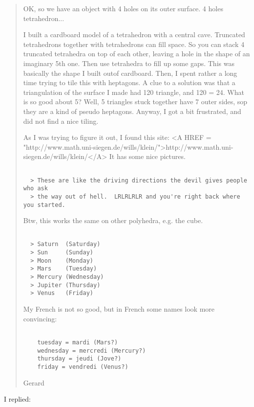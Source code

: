 \begin{quote}
OK, so we have an object with 4 holes on its outer surface.
4 holes \to  tetrahedron...

I built a cardboard model of a tetrahedron with a central
cave.  Truncated tetrahedrons together with tetrahedrons
can fill space.  So you can stack 4 truncated tetrahedra
on top of each other, leaving a hole in the shape of
an imaginary 5th one. Then use tetrahedra to fill up
some gaps. This was basically the shape I built outof
cardboard. Then, I spent rather a long time trying to
tile this with heptagons. A clue to a solution was
that a triangulation of the surface I made had 120
triangle, and 120 = 24. What is so good about 5?
Well, 5 triangles stuck together have 7 outer sides,
sop they are a kind of pseudo heptagons. Anyway, I
got a bit frustrated, and did not find a nice tiling.

As I was trying to figure it out, I found this site:
<A HREF = "http://www.math.uni-siegen.de/wills/klein/">http://www.math.uni-siegen.de/wills/klein/</A>
It has some nice pictures.


\begin{verbatim}

  > These are like the driving directions the devil gives people who ask
  > the way out of hell.  LRLRLRLR and you're right back where you started.
\end{verbatim}
    
Btw, this works the same on other polyhedra, e.g. the cube.


\begin{verbatim}

  > Saturn  (Saturday)
  > Sun     (Sunday)
  > Moon    (Monday)
  > Mars    (Tuesday)
  > Mercury (Wednesday)
  > Jupiter (Thursday)
  > Venus   (Friday)
\end{verbatim}
    

My French is not so good, but in French some names look more
convincing:


\begin{verbatim}

    tuesday = mardi (Mars?)
    wednesday = mercredi (Mercury?)
    thursday = jeudi (Jove?)
    friday = vendredi (Venus?)
\end{verbatim}
    

Gerard
\end{quote}

I replied:


